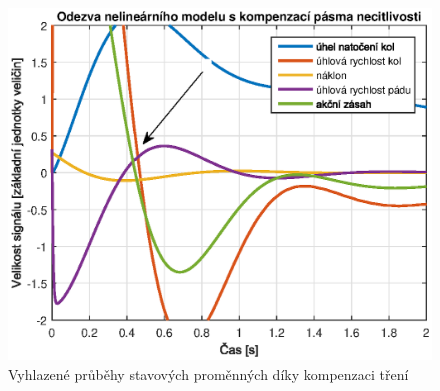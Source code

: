 \documentclass[conference]{IEEEtran}
\begin{document}
\begin{figure}[htbp]
    \centerline{\includegraphics[width=\linewidth]{regulace_kompenzace_treni.eps}}
    \caption{Vyhlazené průběhy stavových proměnných díky kompenzaci tření}
    \label{fig:kompenzace_treni}        
\end{figure}
\end{document}
